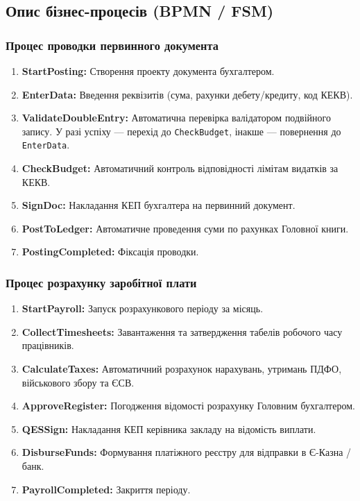 \documentclass{article}
\begin{document}
\subsection{Опис бізнес-процесів (BPMN / FSM)}

\subsubsection{Процес проводки первинного документа}
\begin{enumerate}
    \item \textbf{StartPosting:} Створення проекту документа бухгалтером.
    \item \textbf{EnterData:} Введення реквізитів (сума, рахунки дебету/кредиту, код КЕКВ).
    \item \textbf{ValidateDoubleEntry:} Автоматична перевірка валідатором подвійного запису. У разі успіху --- перехід до \texttt{CheckBudget}, інакше --- повернення до \texttt{EnterData}.
    \item \textbf{CheckBudget:} Автоматичний контроль відповідності лімітам видатків за КЕКВ.
    \item \textbf{SignDoc:} Накладання КЕП бухгалтера на первинний документ.
    \item \textbf{PostToLedger:} Автоматичне проведення суми по рахунках Головної книги.
    \item \textbf{PostingCompleted:} Фіксація проводки.
\end{enumerate}

\subsubsection{Процес розрахунку заробітної плати}
\begin{enumerate}
    \item \textbf{StartPayroll:} Запуск розрахункового періоду за місяць.
    \item \textbf{CollectTimesheets:} Завантаження та затвердження табелів робочого часу працівників.
    \item \textbf{CalculateTaxes:} Автоматичний розрахунок нарахувань, утримань ПДФО, військового збору та ЄСВ.
    \item \textbf{ApproveRegister:} Погодження відомості розрахунку Головним бухгалтером.
    \item \textbf{QESSign:} Накладання КЕП керівника закладу на відомість виплати.
    \item \textbf{DisburseFunds:} Формування платіжного реєстру для відправки в Є-Казна / банк.
    \item \textbf{PayrollCompleted:} Закриття періоду.
\end{enumerate}
\end{document}

